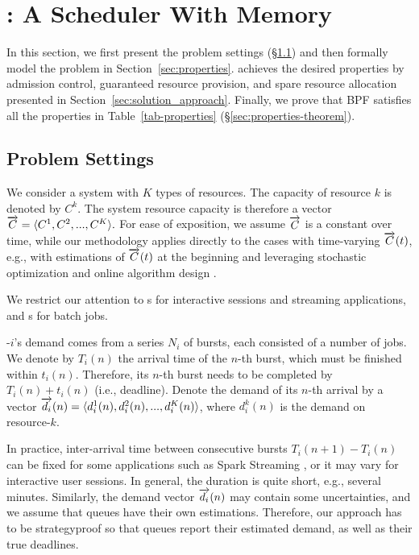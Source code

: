 \section{\name: A Scheduler With Memory}
\label{sec:approach}

In this section, we first present the problem settings (\S\ref{sec:settings}) and then formally model the problem in Section~\ref{sec:properties}. \name achieves the desired properties by admission control, guaranteed resource provision, and spare resource allocation presented in Section~\ref{sec:solution_approach}. 
Finally, we prove that BPF satisfies all the properties in Table~\ref{tab-properties} (\S\ref{sec:properties-theorem}).

\subsection{Problem Settings}\label{sec:settings}
We consider a system with $K$ types of resources. The capacity of resource $k$ is denoted by $C^k$. The system resource capacity is therefore a vector $\protect\overrightarrow{C} = \langle C^1, C^2, ..., C^K \rangle.$
For ease of exposition, we assume $\protect\overrightarrow{C}$ is a constant over time, while our methodology applies directly to the cases with time-varying $\protect\overrightarrow{C}(t)$, e.g., with estimations of $\protect\overrightarrow{C}(t)$ at the beginning and leveraging stochastic optimization \cite{schneider2007stochastic} and online algorithm design \cite{jaillet2012online}.%

We restrict our attention to {\burstq}s for interactive sessions and streaming applications, and {{\batchq}}s for batch jobs. 

{\burstq}-$i$'s demand comes from a series $N_i$ of bursts, each consisted of a number of jobs. We denote by $T_i(n)$ the arrival time of the $n$-th burst, which must be finished within $t_i(n)$. Therefore, its $n$-th burst needs to be completed by $T_i(n)+t_i(n)$ (i.e., deadline).
Denote the demand of its $n$-th arrival by a vector $\protect\overrightarrow{d_i}(n)=\langle d^1_i(n), d^2_i(n), ..., d^K_i(n)\rangle$, where $d^k_i(n)$ is the demand on resource-$k$.

In practice, inter-arrival time between consecutive bursts $T_i(n+1)-T_i(n)$ can be fixed for some applications such as Spark Streaming \cite{spark-streaming}, or it may vary for interactive user sessions. In general, the duration is quite short, e.g., several minutes. 
Similarly, the demand vector $\protect\overrightarrow{d_i}(n)$ may contain some uncertainties, and we assume that queues have their own estimations. Therefore, our approach has to be strategyproof so that queues report their estimated demand, %
as well as their true deadlines. 

